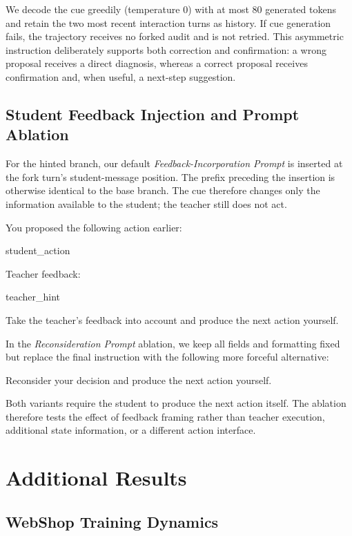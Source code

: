 \documentclass{article}
\begin{document}
We decode the cue greedily (temperature $0$) with at most 80 generated tokens and retain the two
most recent interaction turns as history.  If cue generation fails, the trajectory receives no
forked audit and is not retried.  This asymmetric instruction deliberately supports both correction
and confirmation: a wrong proposal receives a direct diagnosis, whereas a correct proposal receives
confirmation and, when useful, a next-step suggestion.

\subsection{Student Feedback Injection and Prompt Ablation}
\label{app:student-feedback-prompts}

For the hinted branch, our default \emph{Feedback-Incorporation Prompt} is inserted at the fork turn's student-message
position.  The prefix preceding the insertion is otherwise identical to the base branch.  The cue
therefore changes only the information available to the student; the teacher still does not act.

\begin{promptbox}
You proposed the following action earlier:

{student_action}

Teacher feedback:

{teacher_hint}

Take the teacher's feedback into account and produce the next action
yourself.
\end{promptbox}

In the \emph{Reconsideration Prompt} ablation, we keep all fields and formatting fixed but replace
the final instruction with the following more forceful alternative:

\begin{promptbox}
Reconsider your decision and produce the next action yourself.
\end{promptbox}

Both variants require the student to produce the next action itself.  The ablation therefore tests
the effect of feedback framing rather than teacher execution, additional state information, or a
different action interface.

\section{Additional Results}
\label{app:additional-results}

\subsection{WebShop Training Dynamics}
\label{app:webshop-training-dynamics}
\end{document}
